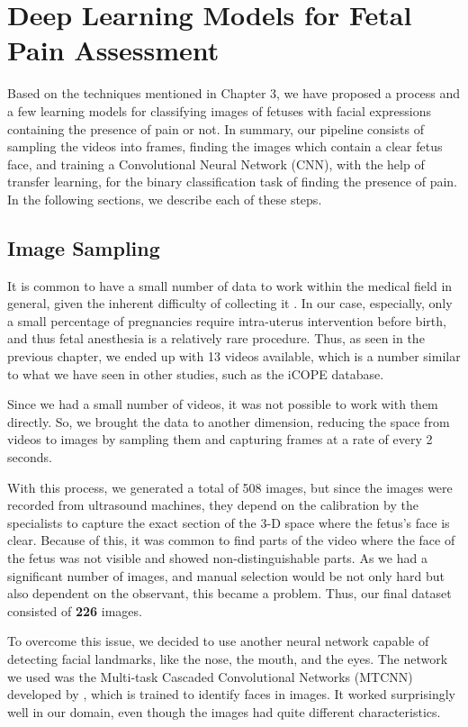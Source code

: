 \chapter{Deep Learning Models for Fetal Pain Assessment}

Based on the techniques mentioned in Chapter 3, we have proposed a process and a few learning models for classifying images of fetuses with facial expressions containing the presence of pain or not. In summary, our pipeline consists of sampling the videos into frames, finding the images which contain a clear fetus face, and training a Convolutional Neural Network (CNN), with the help of transfer learning, for the binary classification task of finding the presence of pain. In the following sections, we describe each of these steps.

\section{Image Sampling}

It is common to have a small number of data to work within the medical field in general, given the inherent difficulty of collecting it \citep{abs-1908-00473}. In our case, especially, only a small percentage of pregnancies require intra-uterus intervention before birth, and thus fetal anesthesia is a relatively rare procedure. Thus, as seen in the previous chapter, we ended up with 13 videos available, which is a number similar to what we have seen in other studies, such as the iCOPE database.

Since we had a small number of videos, it was not possible to work with them directly. So, we brought the data to another dimension, reducing the space from videos to images by sampling them and capturing frames at a rate of every 2 seconds. 

With this process, we generated a total of 508 images, but since the images were recorded from ultrasound machines, they depend on the calibration by the specialists to capture the exact section of the 3-D space where the fetus's face is clear. Because of this, it was common to find parts of the video where the face of the fetus was not visible and showed non-distinguishable parts. As we had a significant number of images, and manual selection would be not only hard but also dependent on the observant, this became a problem. Thus, our final dataset consisted of \textbf{226} images.

To overcome this issue, we decided to use another neural network capable of detecting facial landmarks, like the nose, the mouth, and the eyes. The network we used was the Multi-task Cascaded Convolutional Networks (MTCNN) developed by \cite{ZhangZL016}, which is trained to identify faces in images. It worked surprisingly well in our domain, even though the images had quite different characteristics.


